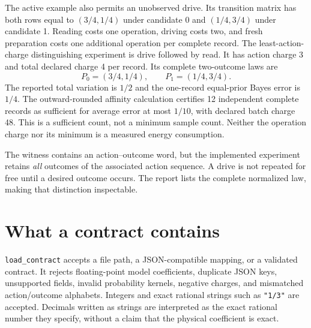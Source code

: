 The active example also permits an unobserved drive. Its transition matrix
has both rows equal to $(3/4,1/4)$ under candidate 0 and $(1/4,3/4)$ under
candidate 1. Reading costs one operation, driving costs two, and fresh
preparation costs one additional operation per complete record. The
least-action-charge distinguishing experiment is drive followed by read.
It has action charge 3 and total declared charge 4 per record. Its complete
two-outcome laws are
\[
 P_0=(3/4,1/4),\qquad P_1=(1/4,3/4).
\]
The reported total variation is $1/2$ and the one-record equal-prior Bayes
error is $1/4$. The outward-rounded affinity calculation certifies 12
independent complete records as sufficient for average error at most
$1/10$, with declared batch charge 48. This is a sufficient count, not a
minimum sample count. Neither the operation charge nor its minimum is a
measured energy consumption.

The witness contains an action--outcome word, but the implemented experiment
retains \emph{all} outcomes of the associated action sequence. A drive is
not repeated for free until a desired outcome occurs. The report lists the
complete normalized law, making that distinction inspectable.

\section{What a contract contains}

\texttt{load\_contract} accepts a file path, a JSON-compatible mapping, or a
validated contract. It rejects floating-point model coefficients, duplicate
JSON keys, unsupported fields, invalid probability kernels, negative
charges, and mismatched action/outcome alphabets. Integers and exact
rational strings such as \texttt{"1/3"} are accepted. Decimals written as
strings are interpreted as the exact rational number they specify, without
a claim that the physical coefficient is exact.

